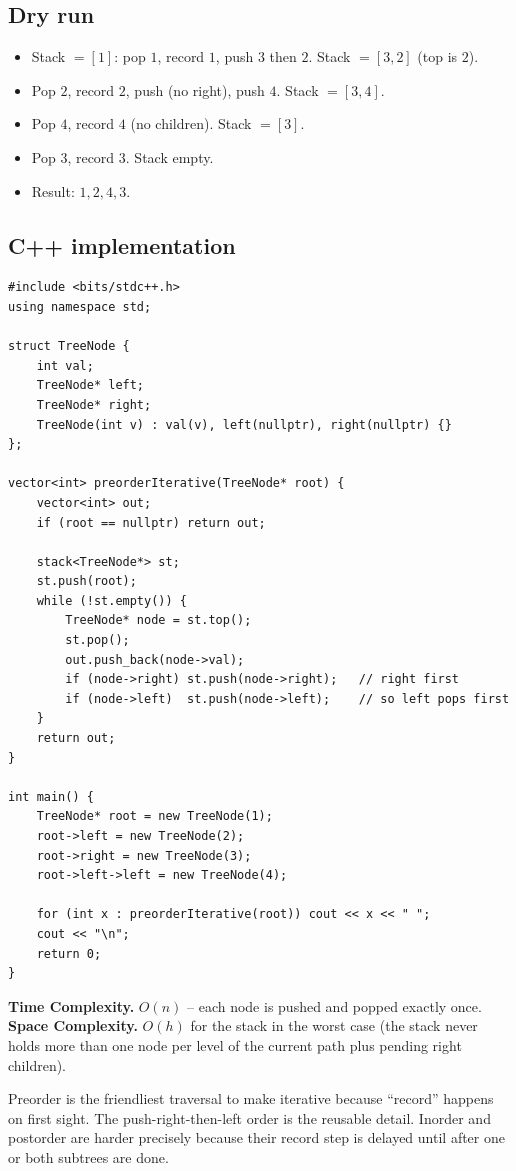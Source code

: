 \subsection*{Dry run}


\begin{itemize}
  \item Stack $=[1]$: pop $1$, record $1$, push $3$ then $2$. Stack
        $=[3,2]$ (top is $2$).
  \item Pop $2$, record $2$, push (no right), push $4$. Stack $=[3,4]$.
  \item Pop $4$, record $4$ (no children). Stack $=[3]$.
  \item Pop $3$, record $3$. Stack empty.
  \item Result: $1,2,4,3$.
\end{itemize}

\subsection*{C++ implementation}

\begin{lstlisting}
#include <bits/stdc++.h>
using namespace std;

struct TreeNode {
    int val;
    TreeNode* left;
    TreeNode* right;
    TreeNode(int v) : val(v), left(nullptr), right(nullptr) {}
};

vector<int> preorderIterative(TreeNode* root) {
    vector<int> out;
    if (root == nullptr) return out;

    stack<TreeNode*> st;
    st.push(root);
    while (!st.empty()) {
        TreeNode* node = st.top();
        st.pop();
        out.push_back(node->val);
        if (node->right) st.push(node->right);   // right first
        if (node->left)  st.push(node->left);    // so left pops first
    }
    return out;
}

int main() {
    TreeNode* root = new TreeNode(1);
    root->left = new TreeNode(2);
    root->right = new TreeNode(3);
    root->left->left = new TreeNode(4);

    for (int x : preorderIterative(root)) cout << x << " ";
    cout << "\n";
    return 0;
}
\end{lstlisting}

\begin{complexitybox}
\textbf{Time Complexity.} $O(n)$ -- each node is pushed and popped exactly
once. \textbf{Space Complexity.} $O(h)$ for the stack in the worst case
(the stack never holds more than one node per level of the current path
plus pending right children).
\end{complexitybox}

\begin{takeawaybox}
Preorder is the friendliest traversal to make iterative because ``record''
happens on first sight. The push-right-then-left order is the reusable
detail. Inorder and postorder are harder precisely because their record
step is delayed until after one or both subtrees are done.
\end{takeawaybox}
